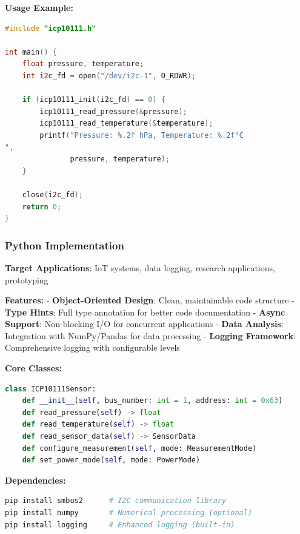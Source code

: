 \documentclass[11pt,a4paper]{article}
\begin{document}
\textbf{Usage Example:}
\begin{lstlisting}[language=c]
#include "icp10111.h"

int main() {
    float pressure, temperature;
    int i2c_fd = open("/dev/i2c-1", O_RDWR);
    
    if (icp10111_init(i2c_fd) == 0) {
        icp10111_read_pressure(&pressure);
        icp10111_read_temperature(&temperature);
        printf("Pressure: %.2f hPa, Temperature: %.2f°C
", 
               pressure, temperature);
    }
    
    close(i2c_fd);
    return 0;
}
\end{lstlisting}

\subsubsection{Python Implementation}

\textbf{Target Applications}: IoT systems, data logging, research applications, prototyping

\textbf{Features:}
- \textbf{Object-Oriented Design}: Clean, maintainable code structure
- \textbf{Type Hints}: Full type annotation for better code documentation  
- \textbf{Async Support}: Non-blocking I/O for concurrent applications
- \textbf{Data Analysis}: Integration with NumPy/Pandas for data processing
- \textbf{Logging Framework}: Comprehensive logging with configurable levels

\textbf{Core Classes:}
\begin{lstlisting}[language=python]
class ICP10111Sensor:
    def __init__(self, bus_number: int = 1, address: int = 0x63)
    def read_pressure(self) -> float
    def read_temperature(self) -> float  
    def read_sensor_data(self) -> SensorData
    def configure_measurement(self, mode: MeasurementMode)
    def set_power_mode(self, mode: PowerMode)
\end{lstlisting}

\textbf{Dependencies:}
\begin{lstlisting}[language=bash]
pip install smbus2      # I2C communication library
pip install numpy       # Numerical processing (optional)
pip install logging     # Enhanced logging (built-in)
\end{lstlisting}
\end{document}
